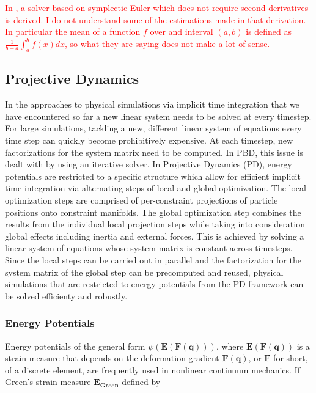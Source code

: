 \documentclass{article}
\begin{document}
\textcolor{red}{
    In \cite{servin2006}, a solver based on symplectic Euler which does not require second derivatives is derived. I do not understand some of the
    estimations made in that derivation. In particular the mean of a function $f$ over and interval $(a, b)$ is defined as $\frac{1}{b-a}
    \int_a^b f(x) dx$, so what they are saying does not make a lot of sense.}


\subsection*{Projective Dynamics}

In the approaches to physical simulations via implicit time integration that we have encountered so far a new linear system needs to be solved
at every timestep. For large simulations, tackling a new, different linear system of equations every time step can quickly become prohibitively 
expensive. At each timestep, new factorizations for the system matrix need to be computed. In PBD, this issue is dealt with by using an iterative 
solver. In Projective Dynamics (PD), energy potentials are restricted to a specific structure which allow for efficient implicit time integration 
via alternating steps of local and global optimization. The local optimization steps are comprised of per-constraint projections of particle 
positions onto constraint manifolds. The global optimization step combines the results from the individual local projection steps while taking
into consideration global effects including inertia and external forces. This is achieved by solving a linear system of equations whose system 
matrix is constant across timesteps. Since the local steps can be carried out in parallel and the factorization for the system matrix of the 
global step can be precomputed and reused, physical simulations that are restricted to energy potentials from the PD framework can be solved 
efficienty and robustly.

\subsubsection*{Energy Potentials}

Energy potentials of the general form $\psi(\bm{E}(\bm{F}(\bm{q})))$, where $\bm{E}(\bm{F}(\bm{q}))$ is a strain measure that depends on the 
deformation gradient $\bm{F}(\bm{q})$, or $\bm{F}$ for short, of a discrete element, are frequently used in nonlinear continuum mechanics. If 
Green's strain measure $\bm{E_{\text{Green}}}$ defined by 
\end{document}

